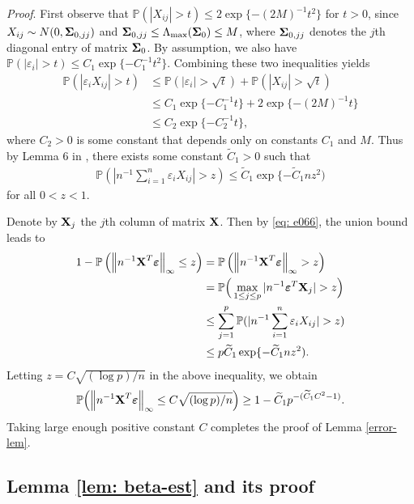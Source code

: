 \documentclass[11pt]{article}
\newcommand{\bX}{\mbox{\bf X}}
\newcommand{\bveps}{\mbox{\boldmath $\varepsilon$}}
\newcommand{\bSig}{\mbox{\boldmath $\Sigma$}}
\newcommand{\veps}{\varepsilon}
\begin{document}
\noindent \textit{Proof}. First observe that $ \mathbb{P} (| X_{ij}| > t ) \leq 2 \exp \{ - (2 M )^{-1} t^{2} \} $ for $t > 0$,
since $X_{ij} \sim N(0, \bSig_{0,jj}) $ and $\bSig_{0,jj} \leq \Lambda_{\max}(\bSig_0) \leq M$, where $\bSig_{0,jj}$ denotes the $j$th diagonal entry of matrix $\bSig_0$. By assumption, we also have $ \mathbb{P} ( | \veps _{i} | > t ) \leq C_{1} \exp \{ -C_{1}^{-1} t^{2} \}$. Combining these two inequalities yields
\begin{align*}
\mathbb{P} ( | \veps_{i} X_{ij} | > t )
& \leq \mathbb{P}(|\veps_{i}| > \sqrt{t}) + \mathbb{P}(|X_{ij}| > \sqrt{t}) \\
& \leq C_{1} \exp \{ -C_{1}^{-1} t \} + 2 \exp \{ - (2 M )^{-1} t \} \\
& \leq C_{2} \exp\{-C_{2}^{-1} t\},
\end{align*}
where $C_{2} > 0$ is some constant that depends only on constants $C_{1}$ and $M$. Thus by Lemma 6 in \cite{Fan2016interaction}, there exists some constant $\widetilde{C}_{1} > 0$ such that
\begin{align}\label{eq: e066}
\mathbb{P}(|n^{-1} \sum_{i=1}^{n}\veps_{i} X_{ij}| > z )
\leq \widetilde{C}_{1} \exp \{ - \widetilde{C}_{1} n z^{2})
\end{align}
for all $0 < z < 1$.

Denote by ${\bX}_{j}$ the $j$th column of matrix ${\bX}$. Then by \eqref{eq: e066}, the union bound leads to
\begin{align*}
1 - \mathbb{P}\left(\Big\|n^{-1}{\bX}^T\bveps\Big\|_{\infty} \le z\right)
& = \mathbb{P}\left(\Big\|n^{-1}{\bX}^T\bveps\Big\|_{\infty}> z\right) \\
& = \mathbb{P}\Big(\max_{1\le j\le p}|n^{-1}\bveps^T{\bX}_{j}|> z\Big)\\
& \le \sum_{j=1}^p \mathbb{P}(|n^{-1} \sum_{i=1}^{n}\veps_{i} X_{ij}| > z )\\
& \leq p \widetilde{C}_{1} \exp \{ - \widetilde{C}_{1} n z^{2}).
\end{align*}
Letting  $z =  C\sqrt{(\log p)/n} $ in the above inequality, we obtain
\begin{align*}
\mathbb{P} \Big( \Big\|n^{-1}{\bX}^T\bveps\Big\|_{\infty} \le C\sqrt{(\log p)/n}\Big)
\geq 1 - \widetilde{C}_{1} p^{-(\widetilde{C}_{1} C^{2} -1)}.
\end{align*}
Taking large enough positive constant $C$ completes the proof of Lemma \ref{error-lem}.


\subsection{Lemma \ref{lem: beta-est} and its proof} \label{appB.2}
\end{document}
